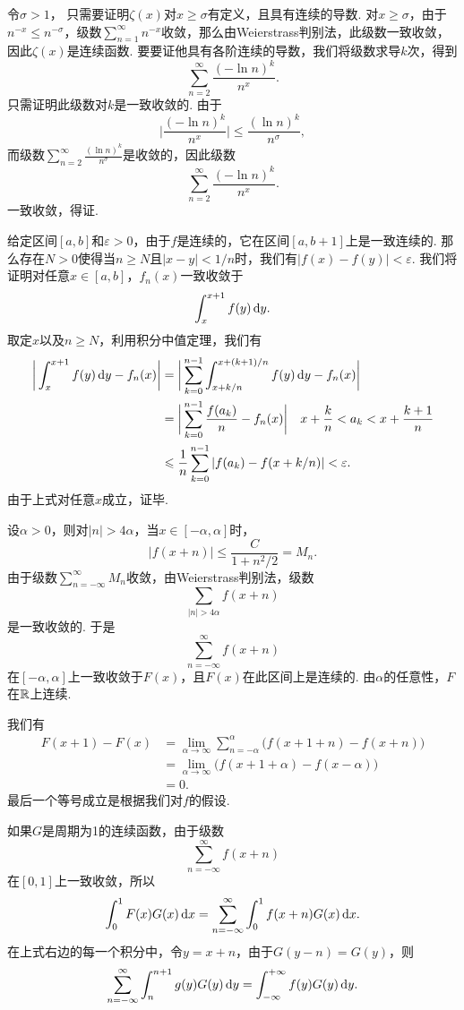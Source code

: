 \begin{ans}
  令$\sigma>1$， 只需要证明$\zeta(x)$对$x\ge\sigma$有定义，且具有连续的导数. 对$x\ge \sigma$，由于$n^{-x}\le n^{-\sigma}$，级数$\sum_{n=1}^\infty n^{-x}$收敛，那么由Weierstrass判别法，此级数一致收敛，因此$\zeta(x)$是连续函数. 要要证他具有各阶连续的导数，我们将级数求导$k$次，得到
  \[
    \sum_{n=2}^\infty\frac{(-\ln n)^k}{n^x}.
  \]
  只需证明此级数对$k$是一致收敛的. 由于
  \[
    \bigg| \frac{(-\ln n)^k}{n^x} \bigg|
    \le \frac{(\ln n)^k}{n^\sigma},
  \]
  而级数$\sum_{n=2}^\infty\frac{(\ln n)^k}{n^\sigma}$是收敛的，因此级数
  \[
    \sum_{n=2}^\infty\frac{(-\ln n)^k}{n^x}.
  \]
  一致收敛，得证.
\end{ans}

\begin{ans}
  给定区间$[a,b]$和$\varepsilon>0$，由于$f$是连续的，它在区间$[a,b+1]$上是一致连续的. 那么存在$N>0$使得当$n\ge N$且$|x-y|<1/n$时，我们有$|f(x)-f(y)|<\varepsilon$. 我们将证明对任意$x\in[a,b]$，$f_n(x)$一致收敛于
  \[
    \int_x^{x+1}f(y)\,\mathrm dy.
  \]
  取定$x$以及$n\ge N$，利用积分中值定理，我们有
  \begin{align*}
    \bigg|
      \int_x^{x+1}f(y)\,\mathrm dy - f_n(x)
    \bigg| & = \bigg|
      \sum_{k=0}^{n-1}\int_{x+k/n}^{x+(k+1)/n}
      f(y)\,\mathrm dy - f_n(x)
    \bigg| \\
    & = \bigg|
      \sum_{k=0}^{n-1} \frac{f(a_k)}n - f_n(x)
    \bigg|\quad x+\frac kn <a_k<x+\frac{k+1}n \\
    & \leqslant \frac1n\sum_{k=0}^{n-1}
    |f(a_k) - f(x+k/n)| < \varepsilon.
  \end{align*}
  由于上式对任意$x$成立，证毕.
\end{ans}

\begin{ans}
  设$\alpha>0$，则对$|n|>4\alpha$，当$x\in[-\alpha,\alpha]$时，
  \[
    |f(x+n)| \le \frac C{1+n^2/2} = M_n.
  \]
  由于级数$\sum_{n=-\infty}^{\infty}M_n$收敛，由Weierstrass判别法，级数
  \[ \sum_{|n|>4\alpha}f(x+n) \]
  是一致收敛的. 于是
  \[ \sum_{n=-\infty}^\infty f(x+n) \]
  在$[-\alpha,\alpha]$上一致收敛于$F(x)$，且$F(x)$在此区间上是连续的. 由$\alpha$的任意性，$F$在$\mathbb R$上连续.
  
  我们有
  \begin{align*}
    F(x+1)-F(x) & = \lim_{\alpha\to\infty}
    \sum_{n=-\alpha}^\alpha\big( f(x+1+n)-f(x+n) \big)\\
    & = \lim_{\alpha\to\infty}\big(f(x+1+\alpha)
    -f(x-\alpha)\big)\\
    & = 0 .
  \end{align*}
  最后一个等号成立是根据我们对$f$的假设.
  
  如果$G$是周期为1的连续函数，由于级数
  \[ \sum_{n=-\infty}^\infty f(x+n) \]
  在$[0,1]$上一致收敛，所以
  \[
    \int_0^1F(x)G(x)\,\mathrm dx = \sum_{n=-\infty}^\infty
     \int_0^1f(x+n)G(x)\,\mathrm dx.
  \]
  在上式右边的每一个积分中，令$y=x+n$，由于$G(y-n)=G(y)$，则
  \[
    \sum_{n=-\infty}^\infty\int_n^{n+1}g(y)G(y)\,\mathrm dy
    =\int_{-\infty}^{+\infty}f(y)G(y)\,\mathrm dy.
  \]
\end{ans}

